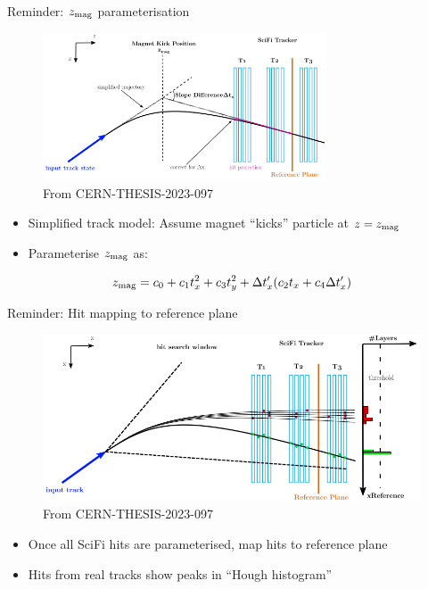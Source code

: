 \documentclass[xcolor={dvipsnames}]{beamer}
\begin{document}
\begin{frame}{Reminder: $z_{\rm mag}$ parameterisation}
  \vspace{0.0cm}
  \begin{figure}[htb]
    \centering
    \includegraphics[width=0.75\textwidth]{Plots/MagnetKinkPosition.png}
    \caption*{\small From CERN-THESIS-2023-097}
  \end{figure}
  \begin{itemize}
    \item{Simplified track model: Assume magnet ``kicks'' particle at $z = z_{\rm mag}$}
    \item{Parameterise $z_{\rm mag}$ as:}
  \end{itemize}
  \begin{equation*}
    z_{\rm mag} = c_0 + c_1t_x^2 + c_3t_y^2 + \Delta t_x^\prime(c_2t_x + c_4\Delta t_x^\prime)
  \end{equation*}
\end{frame}

\begin{frame}{Reminder: Hit mapping to reference plane}
  \vspace{0.0cm}
  \begin{figure}[htb]
    \centering
    \includegraphics[width=1\textwidth]{Plots/HoughTransform.png}
  \caption*{\small From CERN-THESIS-2023-097}
  \end{figure}
  \vspace{-0.3cm}
  \begin{itemize}
    \item{Once all SciFi hits are parameterised, map hits to reference plane}
    \item{Hits from real tracks show peaks in ``Hough histogram''}
  \end{itemize}
\end{frame}
\end{document}
